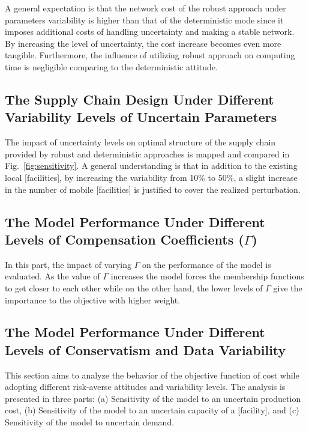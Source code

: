 \documentclass[10pt,twocolumn]{article}
\begin{document}
A general expectation is that the network cost of the robust
approach under parameters variability is higher than that of the
deterministic mode since it imposes additional costs of handling
uncertainty and making a stable network. By increasing the level of
uncertainty, the cost increase becomes even more tangible.
Furthermore, the influence of utilizing robust approach on computing
time is negligible comparing to the deterministic attitude.

\subsection{The Supply Chain Design Under Different Variability
Levels of Uncertain Parameters}

The impact of uncertainty levels on optimal structure of the supply
chain provided by robust and deterministic approaches is mapped and
compared in Fig.~\ref{fig:sensitivity}. A general understanding is
that in addition to the existing local [facilities], by increasing
the variability from 10\% to 50\%, a slight increase in the number
of mobile [facilities] is justified to cover the realized
perturbation.

\subsection{The Model Performance Under Different Levels of
Compensation Coefficients ($\Gamma$)}

In this part, the impact of varying $\Gamma$ on the performance of
the model is evaluated. As the value of $\Gamma$ increases the model
forces the membership functions to get closer to each other while on
the other hand, the lower levels of $\Gamma$ give the importance to
the objective with higher weight.

\subsection{The Model Performance Under Different Levels of
Conservatism and Data Variability}

This section aims to analyze the behavior of the objective function
of cost while adopting different risk-averse attitudes and variability
levels. The analysis is presented in three parts: (a) Sensitivity of
the model to an uncertain production cost, (b) Sensitivity of the
model to an uncertain capacity of a [facility], and (c) Sensitivity
of the model to uncertain demand.

\end{document}

